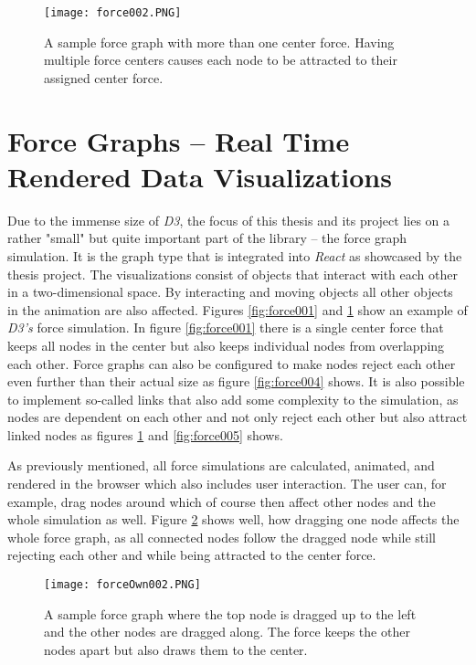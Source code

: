\begin{figure}
  \centering
  \texttt{[image: force002.PNG]}
  \caption{A sample force graph with more than one center force. Having multiple force centers causes each node to be attracted to their assigned center force.}
  \label{fig:force002}
\end{figure}

\section{Force Graphs -- Real Time Rendered Data Visualizations}

Due to the immense size of \emph{D3}, the focus of this thesis and its project lies on a rather "small" but quite important part of the library -- the force graph simulation. It is the graph type that is integrated into \emph{React} as showcased by the thesis project. The visualizations consist of objects that interact with each other in a two-dimensional space. By interacting and moving objects all other objects in the animation are also affected. Figures \ref{fig:force001} and \ref{fig:force002} show an example of \emph{D3's} force simulation. In figure \ref{fig:force001} there is a single center force that keeps all nodes in the center but also keeps individual nodes from overlapping each other. Force graphs can also be configured to make nodes reject each other even further than their actual size as figure \ref{fig:force004} shows. It is also possible to implement so-called links that also add some complexity to the simulation, as nodes are dependent on each other and not only reject each other but also attract linked nodes as figures \ref{fig:force002} and \ref{fig:force005} shows.

As previously mentioned, all force simulations are calculated, animated, and rendered in the browser which also includes user interaction. The user can, for example, drag nodes around which of course then affect other nodes and the whole simulation as well. Figure \ref{fig:force003} shows well, how dragging one node affects the whole force graph, as all connected nodes follow the dragged node while still rejecting each other and while being attracted to the center force.

\begin{figure}
  \centering
  \texttt{[image: forceOwn002.PNG]}
  \caption{A sample force graph where the top node is dragged up to the left and the other nodes are dragged along. The force keeps the other nodes apart but also draws them to the center.}
  \label{fig:force003}
\end{figure}

